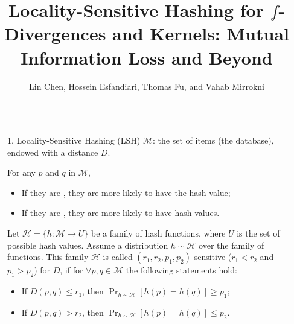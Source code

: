 \documentclass[final]{beamer}
\title{Locality-Sensitive Hashing for $f$-Divergences and \kr Kernels: 
	Mutual 
	Information Loss and Beyond}
\author{Lin Chen\inst{1,2}, 
	Hossein Esfandiari\inst{1},
	Thomas Fu\inst{1}, and
	Vahab Mirrokni\inst{1}
	 \vspace{10pt}}
\institute{{  \inst{1}Google Research, \inst{2}Yale University }\vspace{10pt}}
\DeclareMathOperator{\pr}{Pr}
\newlength{\sepwid}
\newlength{\onecolwid}
\begin{document}
	
	
	
	\begin{frame}[t] %
	\begin{columns}[t] %
	\begin{column}{\sepwid}
	\end{column}
	\begin{column}{\onecolwid} %
			\vspace{-40pt}
				
			\begin{block}{1. Locality-Sensitive Hashing (LSH)}	
				$ \mathcal{M} $: the set of items (the 
				database), endowed with 
				a distance $ D $.	
				
				For any $ p $ and $ q $ in $ \mathcal{M} $,
				\begin{itemize}
					\item If they are , they are more likely 
					to 
					have the 
					 hash value;
					\item If they are , 
					they are more likely to have  hash 
					values. 
				\end{itemize}
				 
				
				  Let $ \mathcal{H} = \{ 
				h:\mathcal{M}\to U \} $ be a 
				family of hash functions, where $ U $ is the set of possible 
				hash values. 
				Assume a distribution $ h\sim 
				\mathcal{H} $ over the family of 
				functions. This family $ \mathcal{H} $ is called $ (r_1, r_2, 
				p_1,p_2) 
				$-sensitive  ($ r_1<r_2 $ and $ p_1>p_2 $) for $ D $, if for $ 
				\forall p, q 
				\in \mathcal{M} $ the following statements hold:
				\begin{itemize}
					\item If $ D(p, q) \le r_1 $, then $ \pr_{h\sim 
						\mathcal{H}}[h(p)=h(q)]\ge p_1 $; 
					\item If $ D(p, q) > r_2 $, then $ \pr_{h\sim 
						\mathcal{H}}[h(p)=h(q)]\le p_2 $.
				\end{itemize}
				

		\end{block}
			

\end{column}
\end{columns}
\end{frame}
\end{document}
